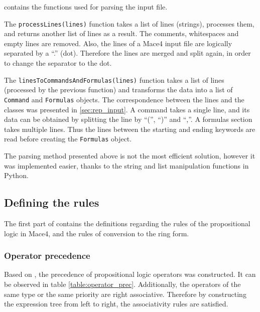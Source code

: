  contains the functions used for parsing the input file.

The \verb|processLines(lines)| function takes a list of lines (strings), processes them, and returns another list of lines as a result. The comments, whitespaces and empty lines are removed. Also, the lines of a Mace4 input file are logically separated by a ``.'' (dot). Therefore the lines are merged and split again, in order to change the separator to the dot.

The \verb|linesToCommandsAndFormulas(lines)| function takes a list of lines (processed by the previous function) and transforms the data into a list of \verb|Command| and \verb|Formulas| objects. The correspondence between the lines and the classes was presented in \ref{sec:rep_input}. A command takes a single line, and its data can be obtained by splitting the line by ``('', ``)'' and ``,''. A formulas section takes multiple lines. Thus the lines between the starting and ending keywords are read before creating the \verb|Formulas| object.

The parsing method presented above is not the most efficient solution, however it was implemented easier, thanks to the string and list manipulation functions in Python. 





\subsection{Defining the rules}

The first part of  contains the definitions regarding the rules of the propositional logic in Mace4, and the rules of conversion to the ring form.

\subsubsection{Operator precedence}

Based on \cite{StanfordOperator}, the precedence of propositional logic operators was constructed. It can be observed in table \ref{table:operator_prec}. Additionally, the operators of the same type or the same priority are right associative. Therefore by constructing the expression tree from left to right, the associativity rules are satisfied.

